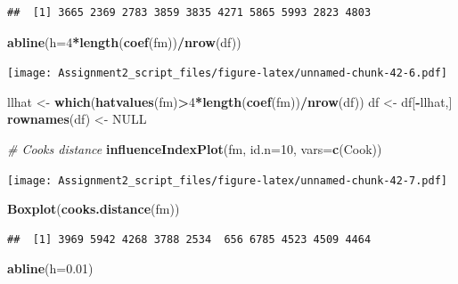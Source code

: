 \documentclass[
]{article}
\newenvironment{Shaded}{\begin{snugshade}}{\end{snugshade}}
\newcommand{\AttributeTok}[1]{\textcolor[rgb]{0.13,0.29,0.53}{#1}}
\newcommand{\CommentTok}[1]{\textcolor[rgb]{0.56,0.35,0.01}{\textit{#1}}}
\newcommand{\ConstantTok}[1]{\textcolor[rgb]{0.56,0.35,0.01}{#1}}
\newcommand{\DecValTok}[1]{\textcolor[rgb]{0.00,0.00,0.81}{#1}}
\newcommand{\FloatTok}[1]{\textcolor[rgb]{0.00,0.00,0.81}{#1}}
\newcommand{\FunctionTok}[1]{\textcolor[rgb]{0.13,0.29,0.53}{\textbf{#1}}}
\newcommand{\NormalTok}[1]{#1}
\newcommand{\OtherTok}[1]{\textcolor[rgb]{0.56,0.35,0.01}{#1}}
\newcommand{\SpecialCharTok}[1]{\textcolor[rgb]{0.81,0.36,0.00}{\textbf{#1}}}
\newcommand{\StringTok}[1]{\textcolor[rgb]{0.31,0.60,0.02}{#1}}
\begin{document}
\begin{verbatim}
##  [1] 3665 2369 2783 3859 3835 4271 5865 5993 2823 4803
\end{verbatim}

\begin{Shaded}
\begin{Highlighting}[]
\FunctionTok{abline}\NormalTok{(}\AttributeTok{h=}\DecValTok{4}\SpecialCharTok{*}\FunctionTok{length}\NormalTok{(}\FunctionTok{coef}\NormalTok{(fm))}\SpecialCharTok{/}\FunctionTok{nrow}\NormalTok{(df))}
\end{Highlighting}
\end{Shaded}

\texttt{[image: Assignment2\_script\_files/figure-latex/unnamed-chunk-42-6.pdf]}

\begin{Shaded}
\begin{Highlighting}[]
\NormalTok{llhat }\OtherTok{\textless{}{-}} \FunctionTok{which}\NormalTok{(}\FunctionTok{hatvalues}\NormalTok{(fm)}\SpecialCharTok{\textgreater{}}\DecValTok{4}\SpecialCharTok{*}\FunctionTok{length}\NormalTok{(}\FunctionTok{coef}\NormalTok{(fm))}\SpecialCharTok{/}\FunctionTok{nrow}\NormalTok{(df))}
\NormalTok{df }\OtherTok{\textless{}{-}}\NormalTok{ df[}\SpecialCharTok{{-}}\NormalTok{llhat,]}
\FunctionTok{rownames}\NormalTok{(df) }\OtherTok{\textless{}{-}} \ConstantTok{NULL}

\CommentTok{\# Cooks distance}
\FunctionTok{influenceIndexPlot}\NormalTok{(fm, }\AttributeTok{id.n=}\DecValTok{10}\NormalTok{, }\AttributeTok{vars=}\FunctionTok{c}\NormalTok{(}\StringTok{\textquotesingle{}Cook\textquotesingle{}}\NormalTok{))}
\end{Highlighting}
\end{Shaded}

\texttt{[image: Assignment2\_script\_files/figure-latex/unnamed-chunk-42-7.pdf]}

\begin{Shaded}
\begin{Highlighting}[]
\FunctionTok{Boxplot}\NormalTok{(}\FunctionTok{cooks.distance}\NormalTok{(fm))}
\end{Highlighting}
\end{Shaded}

\begin{verbatim}
##  [1] 3969 5942 4268 3788 2534  656 6785 4523 4509 4464
\end{verbatim}

\begin{Shaded}
\begin{Highlighting}[]
\FunctionTok{abline}\NormalTok{(}\AttributeTok{h=}\FloatTok{0.01}\NormalTok{)}
\end{Highlighting}
\end{Shaded}
\end{document}
